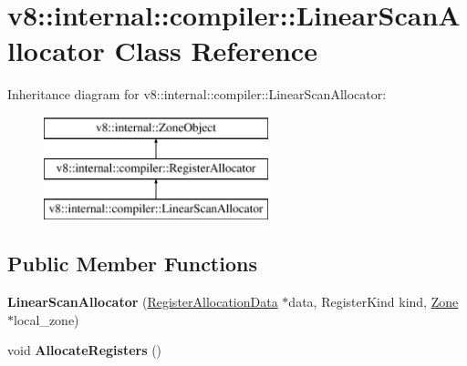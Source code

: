 \hypertarget{classv8_1_1internal_1_1compiler_1_1_linear_scan_allocator}{}\section{v8\+:\+:internal\+:\+:compiler\+:\+:Linear\+Scan\+Allocator Class Reference}
\label{classv8_1_1internal_1_1compiler_1_1_linear_scan_allocator}
Inheritance diagram for v8\+:\+:internal\+:\+:compiler\+:\+:Linear\+Scan\+Allocator\+:\begin{figure}[H]
\begin{center}
\leavevmode
\includegraphics[height=3.000000cm]{classv8_1_1internal_1_1compiler_1_1_linear_scan_allocator}
\end{center}
\end{figure}
\subsection*{Public Member Functions}
\begin{DoxyCompactItemize}
\item 
{\bfseries Linear\+Scan\+Allocator} (\hyperlink{classv8_1_1internal_1_1compiler_1_1_register_allocation_data}{Register\+Allocation\+Data} $\ast$data, Register\+Kind kind, \hyperlink{classv8_1_1internal_1_1_zone}{Zone} $\ast$local\+\_\+zone)\hypertarget{classv8_1_1internal_1_1compiler_1_1_linear_scan_allocator_ac36a7cdac3c23f89dbf157037b45945b}{}\label{classv8_1_1internal_1_1compiler_1_1_linear_scan_allocator_ac36a7cdac3c23f89dbf157037b45945b}

\item 
void {\bfseries Allocate\+Registers} ()\hypertarget{classv8_1_1internal_1_1compiler_1_1_linear_scan_allocator_af090759a2b6c76166a297fe5343fbbe9}{}\label{classv8_1_1internal_1_1compiler_1_1_linear_scan_allocator_af090759a2b6c76166a297fe5343fbbe9}

\end{DoxyCompactItemize}
